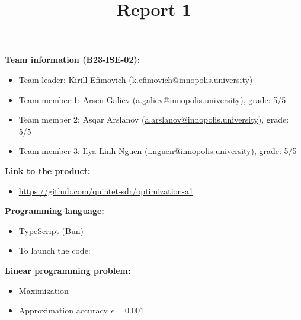 \documentclass{article}
\title{\textbf{Report 1}}
\author{}
\date{}
\newcommand{\Gap}{0.25in}
\begin{document}
\maketitle

\thispagestyle{fancy}

\textbf{Team information (B23-ISE-02):}
\begin{itemize}
    \item Team leader: Kirill Efimovich (\href{mailto:k.efimovich@innopolis.university}{k.efimovich@innopolis.university})
    \item Team member 1: Arsen Galiev (\href{mailto:a.galiev@innopolis.university}{a.galiev@innopolis.university}), grade: 5/5
    \item Team member 2: Asqar Arslanov (\href{mailto:a.arslanov@innopolis.university}{a.arslanov@innopolis.university}), grade: 5/5
    \item Team member 3: Ilya-Linh Nguen (\href{mailto:i.nguen@innopolis.university}{i.nguen@innopolis.university}), grade: 5/5
\end{itemize}

\vspace{\Gap}

\textbf{Link to the product:}
\begin{itemize}
    \item \url{https://github.com/quintet-sdr/optimization-a1}
\end{itemize}

\vspace{\Gap}

\textbf{Programming language:}
\begin{itemize}
    \item TypeScript (Bun)
    \item To launch the code: 
\end{itemize}

\vspace{\Gap}

\textbf{Linear programming problem:}
\begin{itemize}
    \item Maximization
    \item Approximation accuracy \(\epsilon = 0.001\)
\end{itemize}

\vspace{\Gap}
\end{document}
